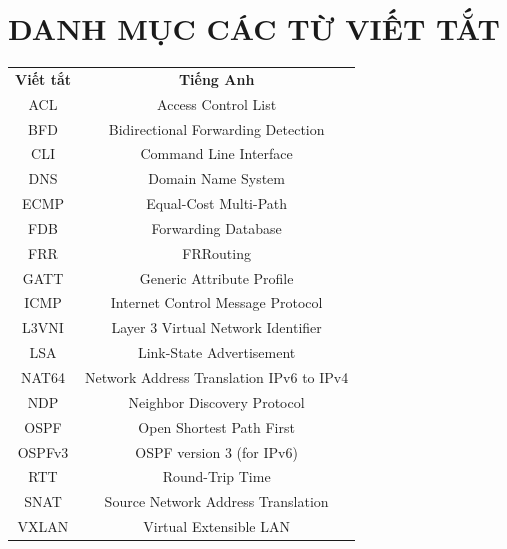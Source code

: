 \section*{DANH MỤC CÁC TỪ VIẾT TẮT}

{
\renewcommand{\arraystretch}{1.3} %
\begin{longtable}{ c @{\hspace{1.5cm}} c }
    \textbf{Viết tắt} & \textbf{Tiếng Anh} \\
    
    ACL & Access Control List \\
    BFD & Bidirectional Forwarding Detection \\
    CLI & Command Line Interface \\
    DNS & Domain Name System \\
    ECMP & Equal-Cost Multi-Path \\
    FDB & Forwarding Database \\
    FRR & FRRouting \\
    GATT & Generic Attribute Profile \\
    ICMP & Internet Control Message Protocol \\
    L3VNI & Layer 3 Virtual Network Identifier \\
    LSA & Link-State Advertisement \\
    NAT64 & Network Address Translation IPv6 to IPv4 \\
    NDP & Neighbor Discovery Protocol \\
    OSPF & Open Shortest Path First \\
    OSPFv3 & OSPF version 3 (for IPv6) \\
    RTT & Round-Trip Time \\
    SNAT & Source Network Address Translation \\
    VXLAN & Virtual Extensible LAN \\
\end{longtable}
}
